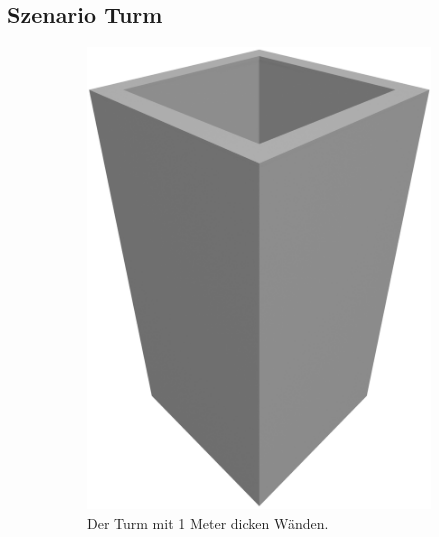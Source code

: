 \subsection{Szenario Turm}\label{poc:scenario1}
\begin{figure}[hbt]
  \hspace*{\fill}%
  \begin{subfigure}[b]{0.25\columnwidth}
    \includegraphics[width=\columnwidth]{fig/scenario1_render_base_thin.png}
    \caption{Der Turm mit 1 Meter dicken Wänden.}\label{fig:poc:scenario1_wall_thin}
  \end{subfigure}
  \hfill%
  \begin{subfigure}[b]{0.25\columnwidth}

\end{subfigure}
\end{figure}

